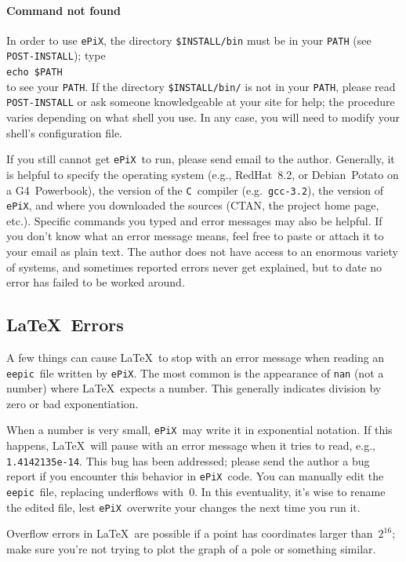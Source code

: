 \documentclass[12pt]{report}
\newcommand{\code}[1]{\texttt{#1}}
\newcommand{\filename}[1]{\texttt{#1}}
\newcommand{\ePiX}{\code{ePiX}}
\newcommand{\eepic}{\code{eepic}}
\newcommand{\C}{\code{C}}
\begin{document}
\paragraph{Command not found} In order to use \ePiX, the directory
\filename{\$INSTALL/bin} must be in your \code{PATH} (see 
\filename{POST-INSTALL}); type\\
\code{echo \$PATH}\\
\noindent to see your \code{PATH}. If the directory
\filename{\$INSTALL/bin/} is not in your \code{PATH}, please read
\filename{POST-INSTALL} or ask someone knowledgeable at your site for
help; the procedure varies depending on what shell you use. In any
case, you will need to modify your shell's configuration file.

If you still cannot get \ePiX\ to run, please send email to the
author. Generally, it is helpful to specify the operating system
(e.g., RedHat~8.2, or Debian~Potato on a G4~Powerbook), the version of
the \C~compiler (e.g.~\code{gcc-3.2}), the version of \ePiX, and
where you downloaded the sources (CTAN, the project home page, etc.).
Specific commands you typed and error messages may also be helpful. If
you don't know what an error message means, feel free to paste or
attach it to your email as plain text. The author does not have access
to an enormous variety of systems, and sometimes reported errors never
get explained, but to date no error has failed to be worked around.


\subsection*{\LaTeX\ Errors}

A few things can cause \LaTeX\ to stop with an error message when
reading an \eepic\ file written by \ePiX. The most common is the
appearance of \code{nan} (not a number) where \LaTeX\ expects a
number. This generally indicates division by zero or bad
exponentiation.

When a number is very small, \ePiX\ may write it in exponential
notation. If this happens, \LaTeX\ will pause with an error message
when it tries to read, e.g., \code{1.4142135e-14}. This bug has been
addressed; please send the author a bug report if you encounter this
behavior in \ePiX\ code. You can manually edit the \eepic\ file,
replacing underflows with~$0$. In this eventuality, it's wise to
rename the edited file, lest \ePiX\ overwrite your changes the next
time you run it.

Overflow errors in \LaTeX\ are possible if a point has coordinates
larger than~$2^{16}$; make sure you're not trying to plot the graph of
a pole or something similar.
\end{document}
